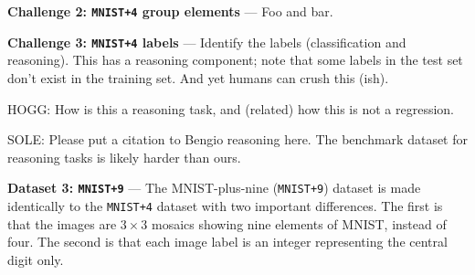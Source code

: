 \documentclass{article}
\renewcommand{\paragraph}[1]{\par\medskip\noindent\textbf{#1} ---}
\begin{document}
\paragraph{Challenge 2: \texttt{MNIST+4} group elements}
Foo and bar.

\paragraph{Challenge 3: \texttt{MNIST+4} labels}
Identify the labels (classification and reasoning).
This has a reasoning component; note that some labels in the test set don't exist in the training set.
And yet humans can crush this (ish).

HOGG: How is this a reasoning task, and (related) how this is not a regression.

SOLE: Please put a citation to Bengio reasoning here. 
The benchmark dataset for reasoning tasks \cite{zhang2021pointer} is likely harder than ours. 

\paragraph{Dataset 3: \texttt{MNIST+9}}
The MNIST-plus-nine (\texttt{MNIST+9}) dataset is made identically to the \texttt{MNIST+4} dataset with two important differences.
The first is that the images are $3\times 3$ mosaics showing nine elements of MNIST, instead of four.
The second is that each image label is an integer representing the central digit only.
\end{document}
